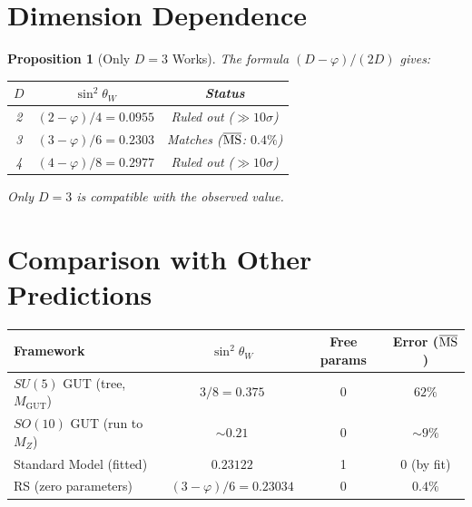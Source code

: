 \documentclass[12pt,a4paper]{article}
\newtheorem{proposition}[theorem]{Proposition}
\theoremstyle{definition}
\theoremstyle{remark}
\begin{document}
\section{Dimension Dependence}
\label{sec:dimension}

\begin{proposition}[Only $D = 3$ Works]
\label{prop:dimension}
The formula $(D - \varphi)/(2D)$ gives:
\begin{center}
\renewcommand{\arraystretch}{1.2}
\begin{tabular}{ccc}
\toprule
$D$ & $\sin^2\theta_W$ & Status \\
\midrule
2 & $(2 - \varphi)/4 = 0.0955$ & Ruled out ($\gg\!10\sigma$) \\
3 & $(3 - \varphi)/6 = 0.2303$ & Matches ($\overline{\rm MS}$: $0.4\%$) \\
4 & $(4 - \varphi)/8 = 0.2977$ & Ruled out ($\gg\!10\sigma$) \\
\bottomrule
\end{tabular}
\end{center}
Only $D = 3$ is compatible with the observed value.
\end{proposition}

\section{Comparison with Other Predictions}
\label{sec:other}

\begin{center}
\renewcommand{\arraystretch}{1.3}
\begin{tabular}{lccc}
\toprule
\textbf{Framework} & \textbf{$\sin^2\theta_W$} &
\textbf{Free params} & \textbf{Error ($\overline{\rm MS}$)} \\
\midrule
$SU(5)$ GUT (tree, $M_\mathrm{GUT}$) & $3/8 = 0.375$ & 0 & $62\%$ \\
$SO(10)$ GUT (run to $M_Z$) & $\sim 0.21$ & 0 & $\sim 9\%$ \\
Standard Model (fitted) & $0.23122$ & 1 & $0$ (by fit) \\
RS (zero parameters) & $(3-\varphi)/6 = 0.23034$ & 0 & $0.4\%$ \\
\bottomrule
\end{tabular}
\end{center}
\end{document}

